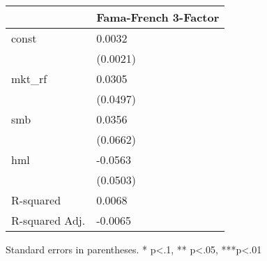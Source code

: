 \begin{table}
\caption{}
\label{}
\begin{center}
\begin{tabular}{ll}
\hline
               & Fama-French 3-Factor  \\
\hline
const          & 0.0032                \\
               & (0.0021)              \\
mkt\_rf        & 0.0305                \\
               & (0.0497)              \\
smb            & 0.0356                \\
               & (0.0662)              \\
hml            & -0.0563               \\
               & (0.0503)              \\
R-squared      & 0.0068                \\
R-squared Adj. & -0.0065               \\
\hline
\end{tabular}
\end{center}
\end{table}
\bigskip
Standard errors in parentheses. \newline 
* p<.1, ** p<.05, ***p<.01